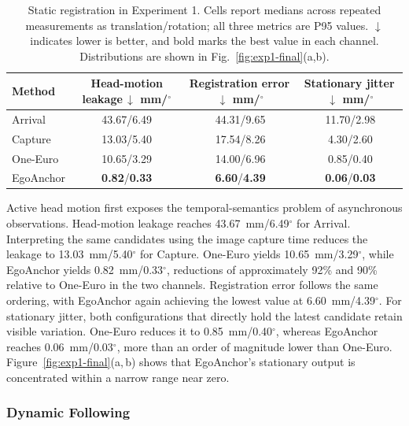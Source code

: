 \documentclass[review]{vgtc}
\begin{document}
\begin{table}[t]
\centering
\caption{Static registration in Experiment 1. Cells report medians across repeated measurements as translation/rotation; all three metrics are P95 values. $\downarrow$ indicates lower is better, and bold marks the best value in each channel. Distributions are shown in Fig.~\ref{fig:exp1-final}(a,b).}
\label{tab:exp1-static}
\begin{tabular}{@{}lccc@{}}
\toprule
Method & \shortstack{Head-motion\\leakage\,$\downarrow$\\mm/$^\circ$} & \shortstack{Registration\\error\,$\downarrow$\\mm/$^\circ$} & \shortstack{Stationary\\jitter\,$\downarrow$\\mm/$^\circ$} \\
\midrule
Arrival & 43.67/6.49 & 44.31/9.65 & 11.70/2.98 \\
Capture & 13.03/5.40 & 17.54/8.26 & 4.30/2.60 \\
One-Euro & 10.65/3.29 & 14.00/6.96 & 0.85/0.40 \\
EgoAnchor & \textbf{0.82}/\textbf{0.33} & \textbf{6.60}/\textbf{4.39} & \textbf{0.06}/\textbf{0.03} \\
\bottomrule
\end{tabular}
\end{table}

Active head motion first exposes the temporal-semantics problem of asynchronous observations. Head-motion leakage reaches 43.67~mm/6.49$^\circ$ for Arrival. Interpreting the same candidates using the image capture time reduces the leakage to 13.03~mm/5.40$^\circ$ for Capture. One-Euro yields 10.65~mm/3.29$^\circ$, while EgoAnchor yields 0.82~mm/0.33$^\circ$, reductions of approximately 92\% and 90\% relative to One-Euro in the two channels. Registration error follows the same ordering, with EgoAnchor again achieving the lowest value at 6.60~mm/4.39$^\circ$. For stationary jitter, both configurations that directly hold the latest candidate retain visible variation. One-Euro reduces it to 0.85~mm/0.40$^\circ$, whereas EgoAnchor reaches 0.06~mm/0.03$^\circ$, more than an order of magnitude lower than One-Euro. Figure~\ref{fig:exp1-final}(a,\,b) shows that EgoAnchor's stationary output is concentrated within a narrow range near zero.

\subsubsection{Dynamic Following}
\end{document}
